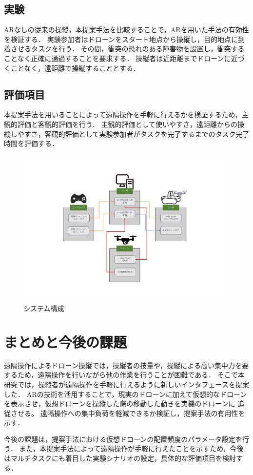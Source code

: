 \documentclass[a4paper,10pt,twocolumn,uplatex]{jsarticle}
\begin{document}
\subsection{実験}
ARなしの従来の操縦，本提案手法を比較することで，ARを用いた手法の有効性を検証する．
実験参加者はドローンをスタート地点から操縦し，目的地点に到着させるタスクを行う．
その間，衝突の恐れのある障害物を設置し，衝突することなく正確に通過することを要求する．
操縦者は近距離までドローンに近づくことなく，遠距離で操縦することとする．


\subsection{評価項目}
本提案手法を用いることによって遠隔操作を手軽に行えるかを検証するため，主観的評価と客観的評価を行う．
主観的評価として使いやすさ，遠距離からの操縦しやすさ，客観的評価として実験参加者がタスクを完了するまでのタスク完了時間を評価する．


\begin{figure}[!tb]
  \centering
  \includegraphics[width=\linewidth]{img/overview.pdf}
  \caption{システム構成}
  \label{fig:overview}
\end{figure}

\section{まとめと今後の課題}
遠隔操作によるドローン操縦では，操縦者の技量や，操縦による高い集中力を要するため，遠隔操作を行いながら他の作業を行うことが困難である．
そこで本研究では，操縦者が遠隔操作を手軽に行えるように新しいインタフェースを提案した．
ARの技術を活用することで，現実のドローンに加えて仮想的なドローンを表示させ，仮想ドローンを操縦した際の移動した動きを実機のドローンに
追従させる。
遠隔操作への集中負荷を軽減できるか検証し，提案手法の有用性を示す．
\par
今後の課題は，提案手法における仮想ドローンの配置頻度のパラメータ設定を行う．
また，本提案手法によって遠隔操作が手軽に行えたことを示すため，今後はマルチタスクにも着目した実験シナリオの設定，具体的な評価項目を検討する．
\end{document}
